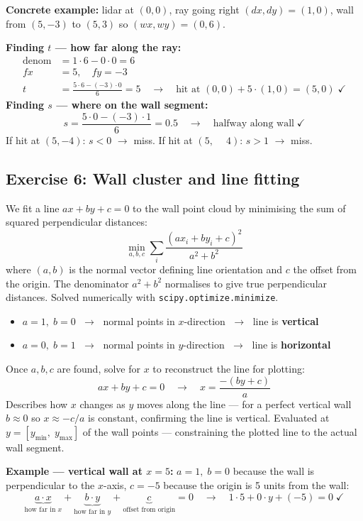 \documentclass[12pt, a4paper]{article}
\begin{document}
\begin{notebox}
  \textbf{Concrete example:} lidar at $(0,0)$, ray going right $(dx,dy)=(1,0)$,
  wall from $(5,-3)$ to $(5,3)$ so $(wx,wy)=(0,6)$.

  \textbf{Finding $t$ --- how far along the ray:}
  \[
  \begin{aligned}
    \text{denom} &= 1\cdot6 - 0\cdot0 = 6 \\
    fx &= 5,\quad fy = -3\\
    t &= \frac{5\cdot6 - (-3)\cdot0}{6} = 5
    \quad\rightarrow\quad \text{hit at }(0,0)+5\cdot(1,0) = (5,0) \;\checkmark
  \end{aligned}
  \]
  \textbf{Finding $s$ --- where on the wall segment:}
  \[
    s = \frac{5\cdot0 - (-3)\cdot1}{6} = 0.5
    \quad\rightarrow\quad \text{halfway along wall} \;\checkmark
  \]
  If hit at $(5,-4)$: $s < 0$ $\rightarrow$ miss.\quad
  If hit at $(5,\phantom{-}4)$: $s > 1$ $\rightarrow$ miss.
\end{notebox}

\subsection*{Exercise 6: Wall cluster and line fitting}

We fit a line $ax+by+c=0$ to the wall point cloud by minimising the sum of
squared perpendicular distances:
\[
  \min_{a,b,c} \sum_{i} \frac{(ax_i + by_i + c)^2}{a^2 + b^2}
\]
where $(a,b)$ is the normal vector defining line orientation and $c$ the
offset from the origin. The denominator $a^2+b^2$ normalises to give true
perpendicular distances. Solved numerically with \texttt{scipy.optimize.minimize}.

\begin{itemize}[leftmargin=1.4em]
  \item $a=1,\; b=0$ $\;\rightarrow\;$ normal points in $x$-direction
        $\;\rightarrow\;$ line is \textbf{vertical}
  \item $a=0,\; b=1$ $\;\rightarrow\;$ normal points in $y$-direction
        $\;\rightarrow\;$ line is \textbf{horizontal}
\end{itemize}

Once $a,b,c$ are found, solve for $x$ to reconstruct the line for plotting:
\[
  ax + by + c = 0 \quad\rightarrow\quad x = \frac{-(by + c)}{a}
\]
Describes how $x$ changes as $y$ moves along the line ---
for a perfect vertical wall $b \approx 0$ so $x \approx -c/a$ is constant,
confirming the line is vertical.
Evaluated at $y = [y_{\min},\; y_{\max}]$ of the wall points ---
constraining the plotted line to the actual wall segment.

\begin{notebox}
  \textbf{Example --- vertical wall at $x=5$:}
  $a=1,\; b=0$ because the wall is perpendicular to the $x$-axis,
  $c=-5$ because the origin is 5 units from the wall:
  \[
    \underbrace{a\cdot x}_{\text{how far in }x} +
    \underbrace{b\cdot y}_{\text{how far in }y} +
    \underbrace{c}_{\text{offset from origin}} = 0
    \quad\rightarrow\quad
    1\cdot5 + 0\cdot y + (-5) = 0 \;\checkmark
  \]
\end{notebox}
\end{document}
